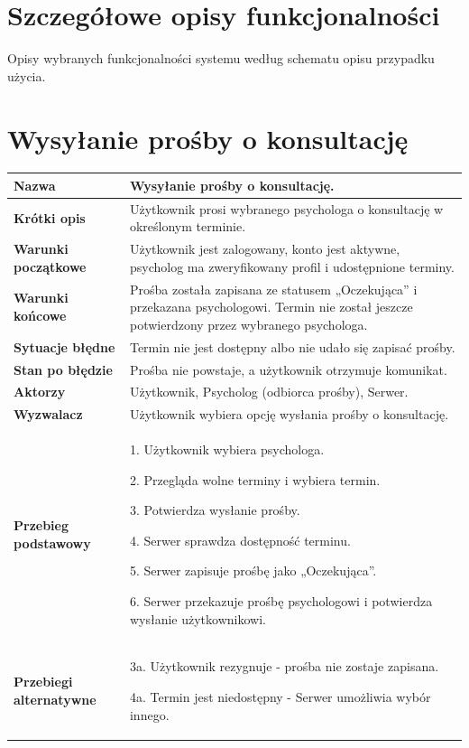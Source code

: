 \documentclass[11pt,a4paper]{article}
\renewcommand{\arraystretch}{1.3}
\newcommand{\pole}[2]{
\textbf{#1} & #2 \\ \hline
}
\begin{document}
\clearpage

\section*{Szczegółowe opisy funkcjonalności}

Opisy wybranych funkcjonalności systemu
według schematu opisu przypadku użycia.

\section*{Wysyłanie prośby o konsultację}

\begingroup
\small
\renewcommand{\arraystretch}{1.14}

\begin{tabularx}{\textwidth}{|p{3.9cm}|Y|}
\hline

\pole{Nazwa}{
Wysyłanie prośby o konsultację.
}

\pole{Krótki opis}{
Użytkownik prosi wybranego psychologa
o konsultację w określonym terminie.
}

\pole{Warunki początkowe}{
Użytkownik jest zalogowany, konto jest aktywne,
psycholog ma zweryfikowany profil
i udostępnione terminy.
}

\pole{Warunki końcowe}{
Prośba została zapisana ze statusem
„Oczekująca” i przekazana psychologowi.
Termin nie został jeszcze potwierdzony przez wybranego psychologa.
}

\pole{Sytuacje błędne}{
Termin nie jest dostępny albo nie udało się
zapisać prośby.
}

\pole{Stan po błędzie}{
Prośba nie powstaje, a użytkownik
otrzymuje komunikat.
}

\pole{Aktorzy}{
Użytkownik,
Psycholog (odbiorca prośby),
Serwer.
}

\pole{Wyzwalacz}{
Użytkownik wybiera opcję wysłania
prośby o konsultację.
}

\pole{Przebieg podstawowy}{
1. Użytkownik wybiera psychologa.\par
2. Przegląda wolne terminy i wybiera termin.\par
3. Potwierdza wysłanie prośby.\par
4. Serwer sprawdza dostępność terminu.\par
5. Serwer zapisuje prośbę jako „Oczekująca”.\par
6. Serwer przekazuje prośbę psychologowi
i potwierdza wysłanie użytkownikowi.
}

\pole{Przebiegi alternatywne}{
3a. Użytkownik rezygnuje -
prośba nie zostaje zapisana.\par
4a. Termin jest niedostępny -
Serwer umożliwia wybór innego.
}

\end{tabularx}
\endgroup
\end{document}
